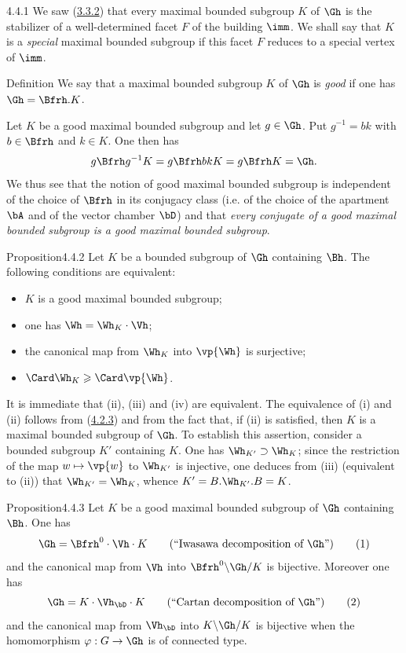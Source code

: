 \documentclass[12pt,a4paper,oneside,english]{smfart}
\makeatletter
\newcommand{\btanchor}[1]{\leavevmode\Hy@raisedlink{\hypertarget{bt:#1}{}}}
\newcommand{\btref}[1]{\hyperlink{bt:#1}{#1}}
\theoremstyle{definition}
\theoremstyle{bt}
\makeatother
\begin{document}
\num{4.4.1}\btanchor{4.4.1}
We saw (\btref{3.3.2}) that every maximal bounded subgroup $K$ of $\Gh$ is the
stabilizer of a well-determined facet $F$ of the building $\imm$. We shall
say that $K$ is a \emph{special} maximal bounded subgroup if this facet $F$
reduces to a special vertex of $\imm$.

\begin{states}{Definition}
We say that a maximal bounded subgroup $K$ of $\Gh$ is \emph{good} if one has
$\Gh = \Bfrh.K$.
\end{states}

Let $K$ be a good maximal bounded subgroup and let $g\in\Gh$. Put
$g^{-1} = bk$ with $b\in\Bfrh$ and $k\in K$. One then has
\[
g\Bfrh g^{-1}K = g\Bfrh bkK = g\Bfrh K = \Gh .
\]
We thus see that the notion of good maximal bounded subgroup is independent
of the choice of $\Bfrh$ in its conjugacy class (i.e. of the choice of the
apartment $\bA$ and of the vector chamber $\bD$) and that \emph{every
conjugate of a good maximal bounded subgroup is a good maximal bounded
subgroup}.

\begin{state}{Proposition}{4.4.2}\btanchor{4.4.2}
Let $K$ be a bounded subgroup of $\Gh$ containing $\Bh$. The following
conditions are equivalent:
\begin{itemize}
\item[(i)] $K$ is a good maximal bounded subgroup;
\item[(ii)] one has $\Wh = \Wh_{K}\cdot\Vh$;
\item[(iii)] the canonical map from $\Wh_{K}$ into $\vp{\Wh}$ is surjective;
\item[(iv)] $\Card\Wh_{K}\geqslant\Card\vp{\Wh}$.
\end{itemize}
\end{state}

It is immediate that (ii), (iii) and (iv) are equivalent. The equivalence of
(i) and (ii) follows from (\btref{4.2.3}) and from the fact that, if (ii) is
satisfied, then $K$ is a maximal bounded subgroup of $\Gh$. To establish this
assertion, consider a bounded subgroup $K'$ containing $K$. One has
$\Wh_{K'}\supset\Wh_{K}$; since the restriction of the map
$w\mapsto \vp{w}$ to $\Wh_{K'}$ is injective, one deduces from (iii)
(equivalent to (ii)) that $\Wh_{K'} = \Wh_{K}$, whence
$K' = B.\Wh_{K'}.B = K$.

\begin{state}{Proposition}{4.4.3}\btanchor{4.4.3}
Let $K$ be a good maximal bounded subgroup of $\Gh$ containing $\Bh$. One has
\begin{equation}
\Gh = \Bfrh^{0}\cdot\Vh\cdot K
\qquad(\text{``Iwasawa decomposition of } \Gh\text{''}) \tag{1}
\end{equation}
and the canonical map from $\Vh$ into $\Bfrh^{0}\backslash\Gh/K$ is
bijective. Moreover one has
\begin{equation}
\Gh = K\cdot\Vh_{\bD}\cdot K
\qquad(\text{``Cartan decomposition of } \Gh\text{''}) \tag{2}
\end{equation}
and the canonical map from $\Vh_{\bD}$ into $K\backslash\Gh/K$ is bijective
when the homomorphism $\varphi : G\to\Gh$ is of connected type.
\end{state}
\end{document}
